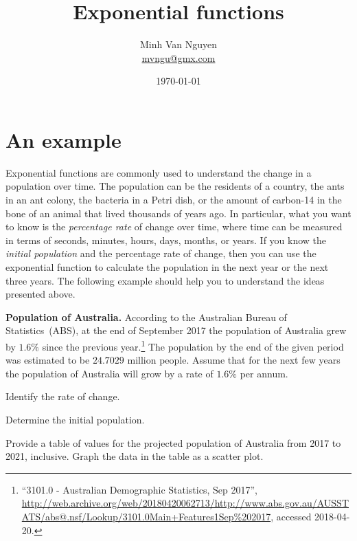 \documentclass[a4paper,oneside,12pt]{article}
\begin{document}
\title{\Large\bf Exponential functions}
\author{%
  Minh Van Nguyen \\
  \url{mvngu@gmx.com}
}
\date{\today}
\maketitle



\section{An example}

Exponential functions are commonly used to understand the change in a
population over time.  The population can be the residents of a
country, the ants in an ant colony, the bacteria in a Petri dish, or
the amount of carbon-14 in the bone of an animal that lived thousands
of years ago.  In particular, what you want to know is the
\emph{percentage rate} of change over time, where time can be measured
in terms of seconds, minutes, hours, days, months, or years.  If you
know the \emph{initial population} and the percentage rate of change,
then you can use the exponential function to calculate the population
in the next year or the next three years.  The following example
should help you to understand the ideas presented above.

\begin{example}
\label{eg:Australian_population_2017}
\textbf{Population of Australia.}
According to the Australian Bureau of Statistics~(ABS), at the end of
September 2017 the population of Australia grew by $1.6\%$ since the
previous year.\footnote{
  ``3101.0 - Australian Demographic Statistics, Sep 2017'',
  \url{http://web.archive.org/web/20180420062713/http://www.abs.gov.au/AUSSTATS/abs@.nsf/Lookup/3101.0Main+Features1Sep\%202017},
  accessed 2018-04-20.
}
The population by the end of the given period was estimated to be
$24.7029$ million people.  Assume that for the next few years the
population of Australia will grow by a rate of $1.6\%$ per annum.
\begin{packedenum}
\item\label{subeg:Australian_population_2017_growth_rate}
  Identify the rate of change.

\item\label{subeg:Australian_population_2017_initial_population}
  Determine the initial population.

\item\label{subeg:Australian_population_2017_table_graph}
  Provide a table of values for the projected population of Australia
  from 2017 to 2021, inclusive.  Graph the data in the table as a
  scatter plot.
\end{packedenum}
\end{example}
\end{document}
